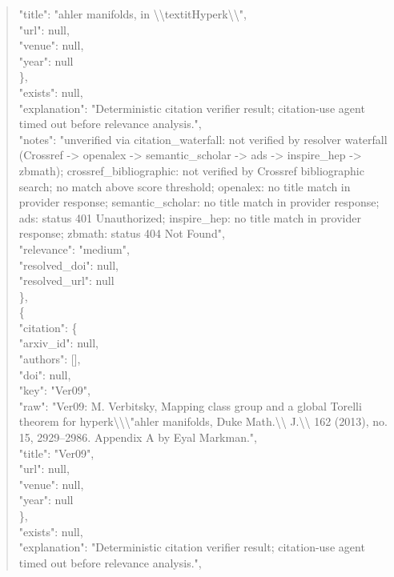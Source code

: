 \documentclass[11pt]{article}
\begin{document}
\begin{quote}
        "title": "ahler manifolds, in \textbackslash{}\textbackslash{}textitHyperk\textbackslash{}\textbackslash{}",\\
        "url": null,\\
        "venue": null,\\
        "year": null\\
      \},\\
      "exists": null,\\
      "explanation": "Deterministic citation verifier result; citation-use agent timed out before relevance analysis.",\\
      "notes": "unverified via citation\_waterfall: not verified by resolver waterfall (Crossref -> openalex -> semantic\_scholar -> ads -> inspire\_hep -> zbmath); crossref\_bibliographic: not verified by Crossref bibliographic search; no match above score threshold; openalex: no title match in provider response; semantic\_scholar: no title match in provider response; ads: status 401 Unauthorized; inspire\_hep: no title match in provider response; zbmath: status 404 Not Found",\\
      "relevance": "medium",\\
      "resolved\_doi": null,\\
      "resolved\_url": null\\
    \},\\
    \{\\
      "citation": \{\\
        "arxiv\_id": null,\\
        "authors": [],\\
        "doi": null,\\
        "key": "Ver09",\\
        "raw": "Ver09: M. Verbitsky, Mapping class group and a global Torelli theorem for hyperk\textbackslash{}\textbackslash{}\textbackslash{}"ahler manifolds, Duke Math.\textbackslash{}\textbackslash{} J.\textbackslash{}\textbackslash{} 162 (2013), no. 15, 2929--2986. Appendix A by Eyal Markman.",\\
        "title": "Ver09",\\
        "url": null,\\
        "venue": null,\\
        "year": null\\
      \},\\
      "exists": null,\\
      "explanation": "Deterministic citation verifier result; citation-use agent timed out before relevance analysis.",\\

\end{quote}
\end{document}
